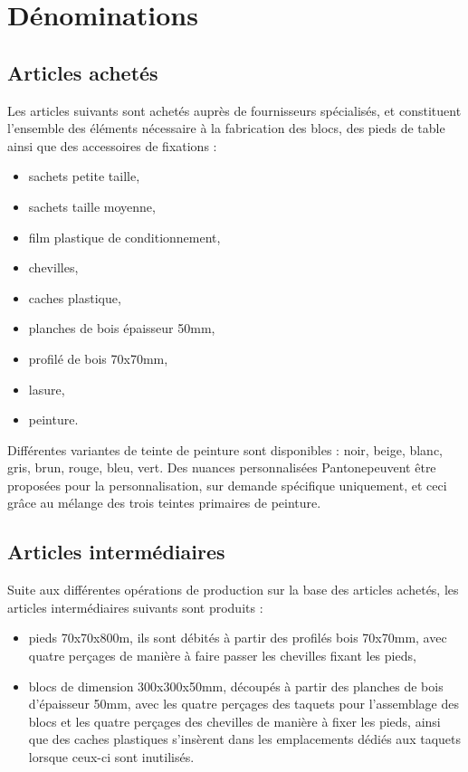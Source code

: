 \section{Dénominations}

\subsection{Articles achetés}

Les articles suivants sont achetés auprès de fournisseurs spécialisés,
et constituent l'ensemble des éléments nécessaire à la fabrication des blocs,
des pieds de table ainsi que des accessoires de fixations :

\begin{itemize}
	\item sachets petite taille,
	\item sachets taille moyenne,
	\item film plastique de conditionnement,
	\item chevilles,
	\item caches plastique,
	\item planches de bois épaisseur 50mm,
	\item profilé de bois 70x70mm,
	\item lasure,
	\item peinture.
\end{itemize}

Différentes variantes de teinte de peinture sont disponibles :
noir, beige, blanc, gris, brun, rouge, bleu, vert.
Des nuances personnalisées Pantone\textregistered peuvent être proposées
pour la personnalisation, sur demande spécifique uniquement, et ceci grâce
au mélange des trois teintes primaires de peinture.

\subsection{Articles intermédiaires}

Suite aux différentes opérations de production sur la base des articles
achetés, les articles intermédiaires suivants sont produits :

\begin{itemize}
	\item pieds 70x70x800m, ils sont débités à partir des profilés bois
	70x70mm, avec quatre perçages de manière à faire passer les chevilles
	fixant les pieds,
	\item blocs de dimension 300x300x50mm, découpés à partir des planches de
	bois d'épaisseur 50mm, avec les quatre perçages des taquets pour l'assemblage
	des blocs et les quatre perçages des chevilles de manière à fixer les pieds,
	ainsi que des caches plastiques s'insèrent dans les emplacements dédiés
	aux taquets lorsque ceux-ci sont inutilisés.
\end{itemize}

